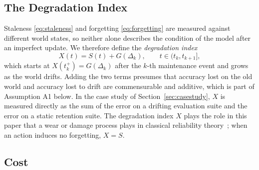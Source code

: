\documentclass[electronics,article,submit,pdftex,moreauthors]{Definitions/mdpi}
\newcommand{\D}{\varDelta}                 %
\newcommand{\tkp}{t_k^{+}}
\begin{document}
\subsection{The Degradation Index}\label{sec:degradation}

Staleness \eqref{eq:staleness} and forgetting \eqref{eq:forgetting} are measured against different world states, so neither alone describes the condition of the model after an imperfect update. We therefore define the \textit{degradation index}
\begin{equation}\label{eq:degradation}
X(t)=S(t)+G(\D_k),\qquad t\in(t_k,t_{k+1}],
\end{equation}
which starts at $X(\tkp)=G(\D_k)$ after the $k$-th maintenance event and grows as the world drifts. Adding the two terms presumes that accuracy lost on the old world and accuracy lost to drift are commensurable and additive, which is part of Assumption A1 below. In the case study of Section~\ref{sec:casestudy}, $X$ is measured directly as the sum of the error on a drifting evaluation suite and the error on a static retention suite. The degradation index $X$ plays the role in this paper that a wear or damage process plays in classical reliability theory~\cite{vanNoortwijk2009}; when an action induces no forgetting, $X=S$.

\subsection{Cost}\label{sec:cost}
\end{document}
